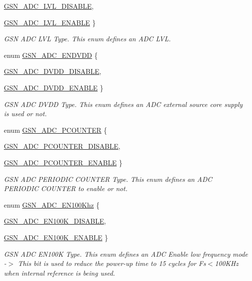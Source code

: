 \begin{DoxyCompactItemize}
\hyperlink{a00643_gga3309e4e970c6632c63ec80fb739e7c0ea98944ab6c93079772221f5026e13f5fb}{GSN\_\-ADC\_\-LVL\_\-DISABLE}, 
\par
\hyperlink{a00643_gga3309e4e970c6632c63ec80fb739e7c0eab638d1688bcb28d51c197aa91dff4c15}{GSN\_\-ADC\_\-LVL\_\-ENABLE}
 \}
\begin{DoxyCompactList}\small\item\em GSN ADC LVL Type. This enum defines an ADC LVL. \end{DoxyCompactList}\item 
enum \hyperlink{a00643_gae153aad95b81d706fe521df66b313c27}{GSN\_\-ADC\_\-ENDVDD} \{ \par
\hyperlink{a00643_ggae153aad95b81d706fe521df66b313c27a7e7c28a508615505b2a64081a84e6663}{GSN\_\-ADC\_\-DVDD\_\-DISABLE}, 
\par
\hyperlink{a00643_ggae153aad95b81d706fe521df66b313c27a64f119159e0b2d5752a2bbc189a53af5}{GSN\_\-ADC\_\-DVDD\_\-ENABLE}
 \}
\begin{DoxyCompactList}\small\item\em GSN ADC DVDD Type. This enum defines an ADC external source core supply is used or not. \end{DoxyCompactList}\item 
enum \hyperlink{a00643_gab6f216973f783f72673e41fefdcd0019}{GSN\_\-ADC\_\-PCOUNTER} \{ \par
\hyperlink{a00643_ggab6f216973f783f72673e41fefdcd0019aaeda64087d3a4710d38a483efcd80301}{GSN\_\-ADC\_\-PCOUNTER\_\-DISABLE}, 
\par
\hyperlink{a00643_ggab6f216973f783f72673e41fefdcd0019a6b3ae43107cef561827087593f54a1bf}{GSN\_\-ADC\_\-PCOUNTER\_\-ENABLE}
 \}
\begin{DoxyCompactList}\small\item\em GSN ADC PERIODIC COUNTER Type. This enum defines an ADC PERIODIC COUNTER to enable or not. \end{DoxyCompactList}\item 
enum \hyperlink{a00643_ga35058132ca643890ae11c73b8a157dcb}{GSN\_\-ADC\_\-EN100Khz} \{ \par
\hyperlink{a00643_gga35058132ca643890ae11c73b8a157dcba872d9cbb58db19da770013c1c7859ac3}{GSN\_\-ADC\_\-EN100K\_\-DISABLE}, 
\par
\hyperlink{a00643_gga35058132ca643890ae11c73b8a157dcbae3bad7e5407e3d785b7fbabac512bba0}{GSN\_\-ADC\_\-EN100K\_\-ENABLE}
 \}
\begin{DoxyCompactList}\small\item\em GSN ADC EN100K Type. This enum defines an ADC Enable low frequency mode -\/$>$ This bit is used to reduce the power-\/up time to 15 cycles for Fs$<$100KHz when internal reference is being used. \end{DoxyCompactList}\item 

\end{DoxyCompactItemize}
